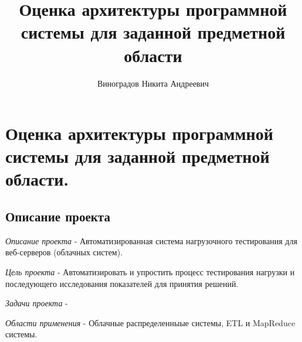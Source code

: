 \documentclass[PI,LAB]{HSEUniversity}
\title{Оценка архитектуры программной системы для заданной предметной области}
\author{Виноградов Никита Андреевич}
\begin{document}
\maketitle



\chapter{Оценка архитектуры программной системы для заданной предметной области. }
\section {Описание проекта}
\emph{Описание проекта} - Автоматизированная система нагрузочного тестирования для веб-серверов (облачных систем).

\emph{Цель проекта} - Автоматизировать и упростить процесс тестирования нагрузки и последующего исследования показателей для принятия решений.

\emph{Задачи проекта} -

\emph{Области применения} - Облачные  распределенныые системы,  ETL и MapReduce системы.
\end{document}
